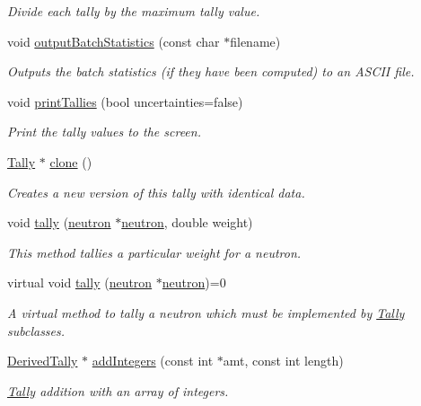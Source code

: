 \begin{DoxyCompactItemize}
\begin{DoxyCompactList}\small\item\em Divide each tally by the maximum tally value. \end{DoxyCompactList}\item 
void \hyperlink{classTally_a4fd93a5423286a5a9b7953cc8d1dcbcf}{output\-Batch\-Statistics} (const char $\ast$filename)
\begin{DoxyCompactList}\small\item\em Outputs the batch statistics (if they have been computed) to an A\-S\-C\-I\-I file. \end{DoxyCompactList}\item 
void \hyperlink{classTally_a768409c213020f8cb544718c1afce0ea}{print\-Tallies} (bool uncertainties=false)
\begin{DoxyCompactList}\small\item\em Print the tally values to the screen. \end{DoxyCompactList}\item 
\hyperlink{classTally}{Tally} $\ast$ \hyperlink{classTally_a9d96448ef6b56fe491a9b4d5e2d454df}{clone} ()
\begin{DoxyCompactList}\small\item\em Creates a new version of this tally with identical data. \end{DoxyCompactList}\item 
void \hyperlink{classTally_a50c7919393799145f1ab23457d47b02b}{tally} (\hyperlink{structneutron}{neutron} $\ast$\hyperlink{structneutron}{neutron}, double weight)
\begin{DoxyCompactList}\small\item\em This method tallies a particular weight for a neutron. \end{DoxyCompactList}\item 
virtual void \hyperlink{classTally_afb566ef038a61e2449311f2ae95e862e}{tally} (\hyperlink{structneutron}{neutron} $\ast$\hyperlink{structneutron}{neutron})=0
\begin{DoxyCompactList}\small\item\em A virtual method to tally a neutron which must be implemented by \hyperlink{classTally}{Tally} subclasses. \end{DoxyCompactList}\item 
\hyperlink{classDerivedTally}{Derived\-Tally} $\ast$ \hyperlink{classTally_a80264c1e85d8ae1163136097621b48ba}{add\-Integers} (const int $\ast$amt, const int length)
\begin{DoxyCompactList}\small\item\em \hyperlink{classTally}{Tally} addition with an array of integers. \end{DoxyCompactList}\item 

\end{DoxyCompactItemize}
